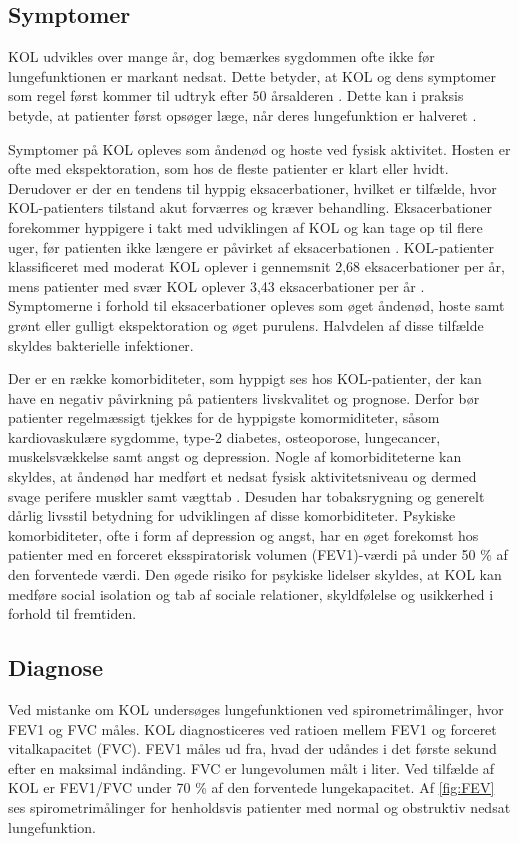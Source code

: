 \subsection{Symptomer}
KOL udvikles over mange år, dog bemærkes sygdommen ofte ikke før lungefunktionen er markant nedsat. Dette betyder, at KOL og dens symptomer som regel først kommer til udtryk efter $50$ årsalderen \cite{Lange2015}. Dette kan i praksis betyde, at patienter først opsøger læge, når deres lungefunktion er halveret \cite{dsam2016}.

Symptomer på KOL opleves som åndenød og hoste ved fysisk aktivitet. Hosten er ofte med ekspektoration, som hos de fleste patienter er klart eller hvidt.\cite{Basisbogen2016} Derudover er der en tendens til hyppig eksacerbationer, hvilket er tilfælde, hvor KOL-patienters tilstand akut forværres og kræver behandling. Eksacerbationer forekommer hyppigere i takt med udviklingen af KOL og kan tage op til flere uger, før patienten ikke længere er påvirket af eksacerbationen \cite{Anzueto2010}. KOL-patienter klassificeret med moderat KOL oplever i gennemsnit 2,68 eksacerbationer per år, mens patienter med svær KOL oplever 3,43 eksacerbationer per år \cite{Anzueto2010}.
Symptomerne i forhold til eksacerbationer opleves som øget åndenød, hoste samt grønt eller gulligt ekspektoration og øget purulens. Halvdelen af disse tilfælde skyldes bakterielle infektioner.\cite{Basisbogen2016,dsam2016} 

Der er en række komorbiditeter, som hyppigt ses hos KOL-patienter, der kan have en negativ påvirkning på patienters livskvalitet og prognose. Derfor bør patienter regelmæssigt tjekkes for de hyppigste komormiditeter, såsom kardiovaskulære sygdomme, type-2 diabetes, osteoporose, lungecancer, muskelsvækkelse samt angst og depression.
Nogle af komorbiditeterne kan skyldes, at åndenød har medført et nedsat fysisk aktivitetsniveau og dermed svage perifere muskler samt vægttab \cite{dsam2016}. Desuden har tobaksrygning og generelt dårlig livsstil betydning for udviklingen af disse komorbiditeter.\cite{dsam2016, McCarthy2015}
Psykiske komorbiditeter, ofte i form af depression og angst, har en øget forekomst hos patienter med en forceret eksspiratorisk volumen (FEV1)-værdi på under 50 \% af den forventede værdi. Den øgede risiko for psykiske lidelser skyldes, at KOL kan medføre social isolation og tab af sociale relationer, skyldfølelse og usikkerhed i forhold til fremtiden.\cite{dsam2016}

\subsection{Diagnose} \label{sec:dia}
Ved mistanke om KOL undersøges lungefunktionen ved spirometrimålinger, hvor FEV1 og FVC måles.
KOL diagnosticeres ved ratioen mellem FEV1 og forceret vitalkapacitet (FVC). FEV1 måles ud fra, hvad der udåndes i det første sekund efter en maksimal indånding. FVC er lungevolumen målt i liter. Ved tilfælde af KOL er FEV1/FVC under 70 \% af den forventede lungekapacitet.\cite{Basisbogen2016} Af \autoref{fig:FEV} ses spirometrimålinger for henholdsvis patienter med normal og obstruktiv nedsat lungefunktion.\cite{Basisbogen2016, Sundhed2013}

